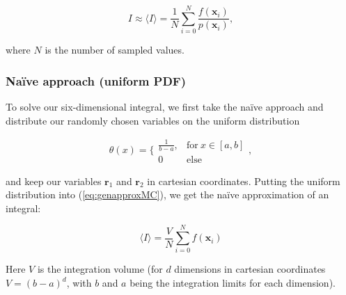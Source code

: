 \documentclass[../main.tex]{subfiles}
\begin{document}
\begin{equation}
  I \approx \langle I \rangle = \frac{1}{N}\sum_{i=0}^N\frac{f(\mathbf x_i)}{p(\mathbf x_i)},
  \label{eq:genapproxMC}
\end{equation}

where  $N$ is the number of sampled values.

\subsubsection{Naïve approach (uniform PDF)}
To solve our six-dimensional integral, we first take the naïve approach and distribute our randomly chosen variables on the uniform distribution

\begin{equation*}
  \theta (x) = \bigg\{ \begin{matrix}\frac{1}{b-a}, & \text{for}\ x\in[a,b] \\ 0 & \text{else}\end{matrix},
\end{equation*}

and keep our variables $\mathbf r_1$ and $\mathbf r_2$ in cartesian coordinates. Putting the uniform distribution into (\ref{eq:genapproxMC}), we get the naïve approximation of an integral:

\begin{equation}
  \langle I\rangle = \frac{V}{N}\sum_{i=0}^Nf(\mathbf x_i)
\end{equation}

Here $V$ is the integration volume (for $d$ dimensions in cartesian coordinates $V=(b-a)^d$, with $b$ and $a$ being the integration limits for each dimension).
\end{document}
